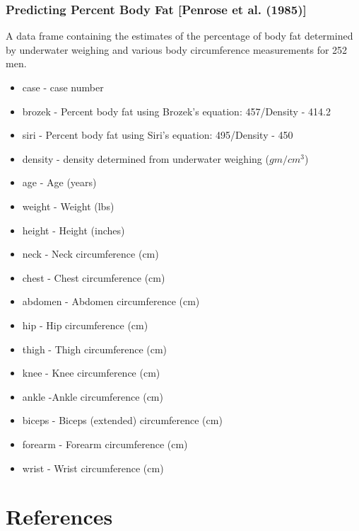 \documentclass[hyperref={pdfpagelabels=true}]{beamer}
\begin{document}
\begin{frame}
\frametitle{Predicting Percent Body Fat [Penrose et al. (1985)]}
A data frame containing the estimates of the percentage of body fat determined by underwater
weighing and various body circumference measurements for 252 men.
\tiny
\begin{itemize}
\item case - case number
\item brozek - Percent body fat using Brozek's equation: 457/Density - 414.2
\item siri - Percent body fat using Siri's equation: 495/Density - 450
\item density - density determined from underwater weighing ($gm/cm^{3}$)
\item age - Age (years)
\item weight - Weight (lbs)
\item height - Height (inches)
\item neck - Neck circumference (cm)
\item chest - Chest circumference (cm)
\item abdomen - Abdomen circumference (cm)
\item hip - Hip circumference (cm)
\item thigh - Thigh circumference (cm)
\item knee - Knee circumference (cm)
\item ankle -Ankle circumference (cm)
\item biceps - Biceps (extended) circumference (cm)
\item forearm - Forearm circumference (cm)
\item wrist - Wrist circumference (cm) 
\end{itemize}
\end{frame}


\section{References}
\setcounter{page}{1}
\footnotesize


\end{document}
